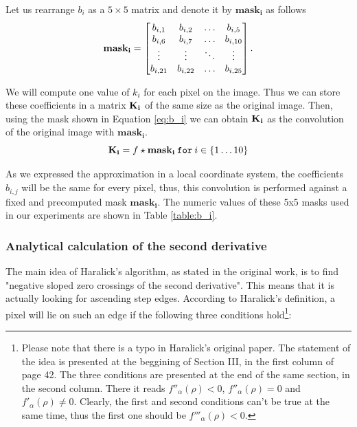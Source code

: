 \documentclass{ipol}
\numberwithin{equation}{section}
\numberwithin{table}{section}
\begin{document}
Let us rearrange $b_i$ as a $5\times5$ matrix and denote it by $\mathbf{mask_i}$ as follows
\begin{equation}
	\label{eq:b_i}
	\mathbf{mask_i} = \begin{bmatrix}	b_{i,1}		& b_{i,2}	& \hdots	& b_{i,5}	\\
									b_{i,6}		& b_{i,7}	& \hdots	& b_{i,10}	\\
									\vdots		& \vdots	& \ddots	& \vdots	\\
									b_{i,21}	 & b_{i,22}	& \hdots	& b_{i,25}	\\
					\end{bmatrix}.\\
\end{equation}

\vspace{1ex}
We will compute one value of $k_i$ for each pixel on the image. Thus we can store these coefficients in a matrix $\bf{K_i}$ of the same size as the original image. Then, using the mask shown in Equation \ref{eq:b_i} we can obtain $\bf{K_i}$ as the convolution of the original image with $\mathbf{mask_i}$. \\
\begin{equation}
	\label{eq:convolution_b}
	\mathbf{K_i} = f \star \mathbf{mask_i} \: \mathtt{for} \: i \in \{1 \ldots 10\}\\
\end{equation}

As we expressed the approximation in a local coordinate system, the coefficients $b_{i,j}$ will be the same for every pixel, thus, this convolution is performed against a fixed and precomputed mask $\mathbf{mask_i}$. The numeric values of these 5x5 masks used in our experiments are shown in Table \ref{table:b_i}.




\subsubsection{Analytical calculation of the second derivative}
\label{sec:secderivative}

The main idea of Haralick's algorithm, as stated in the original work, is to find "negative sloped zero crossings of the second derivative". This means that it is actually looking for ascending step edges. According to Haralick's definition, a pixel will lie on such an edge if the following three conditions hold\footnote{Please note that there is a typo in Haralick's original paper. The statement of the idea is presented at the beggining of Section III, in the first column of page 42. The three conditions are presented at the end of the same section, in the second column. There it reads $f''_{\alpha}(\rho)<0$, $f''_{\alpha}(\rho)=0$ and $f'_{\alpha}(\rho)\neq 0$. Clearly, the first and second conditions can't be true at the same time, thus the first one should be $f'''_{\alpha}(\rho)<0$.}:
\end{document}
